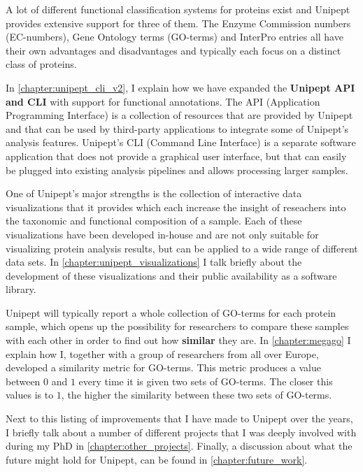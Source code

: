 A lot of different functional classification systems for proteins exist and Unipept provides extensive support for three of them.
The Enzyme Commission numbers (EC-numbers), Gene Ontology terms (GO-terms) and InterPro entries all have their own advantages and disadvantages and typically each focus on a distinct class of proteins.

In \autoref{chapter:unipept_cli_v2}, I explain how we have expanded the \textbf{Unipept API and CLI} with support for functional annotations.
The API (Application Programming Interface) is a collection of resources that are provided by Unipept and that can be used by third-party applications to integrate some of Unipept's analysis features.
Unipept's CLI (Command Line Interface) is a separate software application that does not provide a graphical user interface, but that can easily be plugged into existing analysis pipelines and allows processing larger samples.

One of Unipept's major strengths is the collection of interactive data visualizations that it provides which each increase the insight of reseachers into the taxonomic and functional composition of a sample.
Each of these visualizations have been developed in-house and are not only suitable for visualizing protein analysis results, but can be applied to a wide range of different data sets.
In \autoref{chapter:unipept_visualizations} I talk briefly about the development of these visualizations and their public availability as a software library.

Unipept will typically report a whole collection of GO-terms for each protein sample, which opens up the possibility for researchers to compare these samples with each other in order to find out how \textbf{similar} they are.
In \autoref{chapter:megago} I explain how I, together with a group of researchers from all over Europe, developed a similarity metric for GO-terms.
This metric produces a value between $0$ and $1$ every time it is given two sets of GO-terms.
The closer this values is to $1$, the higher the similarity between these two sets of GO-terms.

Next to this listing of improvements that I have made to Unipept over the years, I briefly talk about a number of different projects that I was deeply involved with during my PhD in \autoref{chapter:other_projects}.
Finally, a discussion about what the future might hold for Unipept, can be found in \autoref{chapter:future_work}.
